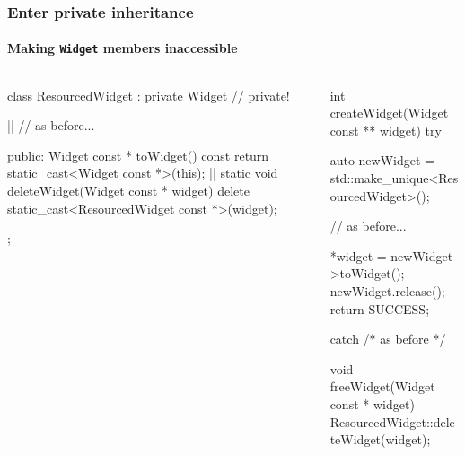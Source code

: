 \documentclass{beamer}
\def\code#1{\texttt{#1}}
\begin{document}
\begin{frame}[fragile]
\frametitle{Enter private inheritance}
\framesubtitle{Making \code{Widget} members inaccessible}
\pause
\begin{columns}
\begin{column}{0.45\textwidth}
\begin{TinyC++}
class ResourcedWidget : private Widget // private!
{ |\pause|
	// as before...

public:	
	Widget const * toWidget() const
	{
		return static_cast<Widget const *>(this);
	}
	|\pause|
	static void deleteWidget(Widget const * widget)
	{
		delete static_cast<ResourcedWidget const *>(widget);
	}
};
\end{TinyC++}
\end{column}

\pause

\begin{column}{0.45\textwidth}
\begin{TinyC++}
int createWidget(Widget const ** widget)
try
{
	auto newWidget = std::make_unique<ResourcedWidget>();
	
	// as before...
    
	*widget = newWidget->toWidget();
	newWidget.release();
	return SUCCESS;
}
catch /* as before */
\end{TinyC++}

\pause

\begin{TinyC++}
void freeWidget(Widget const * widget)
{
	ResourcedWidget::deleteWidget(widget);
}
\end{TinyC++}
\end{column}
\end{columns}
\end{frame}

\end{document}
